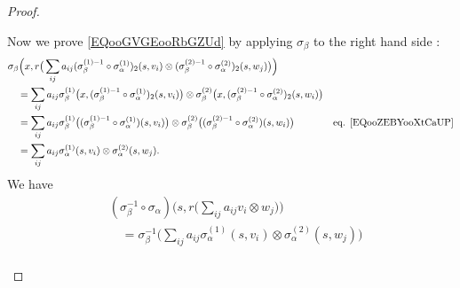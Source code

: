 \begin{proof}
\begin{subproof}
\begin{subproof}
\begin{subproof}
				Now we prove \eqref{EQooGVGEooRbGZUd} by applying \( \sigma_{\beta}\) to the right hand side :
				\begin{subequations}
					\begin{align}
						                                                                                            & \sigma_{\beta}  \Big( x,r\big( \sum_{ij}a_{ij}(\sigma_{\beta}^{(1)-1}\circ \sigma_{\alpha}^{(1)})_2(s,v_i)
						\otimes
						(\sigma_{\beta}^{(2)-1}\circ\sigma_{\alpha}^{(2)})_2(s,w_j)
						\big) \Big)                                                                                                                                                                                              \\
						                                                                                            & \quad  = \sum_{ij}a_{ij}
						\sigma_{\beta}^{(1)}\big( x,  (\sigma_{\beta}^{(1)-1}\circ\sigma_{\alpha}^{(1)})_2(s,v_i) \big)
						\otimes
						\sigma_{\beta}^{(2)}\big( x,  (\sigma_{\beta}^{(2)-1}\circ\sigma_{\alpha}^{(2)})_2(s,w_i) \big)                                                                                                          \\
						                                                                                            & \quad  = \sum_{ij}a_{ij}
						\sigma_{\beta}^{(1)}\big(   (\sigma_{\beta}^{(1)-1}\circ\sigma_{\alpha}^{(1)})(s,v_i) \big)
						\otimes
						\sigma_{\beta}^{(2)}\big(   (\sigma_{\beta}^{(2)-1}\circ\sigma_{\alpha}^{(2)})(s,w_i) \big) & \text{eq. \eqref{EQooZEBYooXtCaUP}}                                                                        \\
						                                                                                            & \quad = \sum_{ij}a_{ij}\sigma_{\alpha}^{(1)}(s,v_i)\otimes \sigma_{\alpha}^{(2)}(s,w_j).
					\end{align}
				\end{subequations}
				\spitem[Conclusion]
				We have
				\begin{subequations}		\label{SUBEQSooRYKSooBkBmaF}
					\begin{align}
						 & (\sigma_{\beta}^{-1}\circ\sigma_{\alpha})\Big( s,r\big( \sum_{ij}a_{ij}v_i\otimes w_j \big) \Big)                                                                                                                               \\
						 & \quad =\sigma_{\beta}^{-1}\Big( \sum_{ij}a_{ij}   \sigma_{\alpha}^{(1)}(s,v_i)\otimes \sigma_{\alpha}^{(2)}(s,w_j)  \Big)                                                                                                       \\

\end{align}
\end{subequations}
\end{subproof}
\end{subproof}
\end{subproof}
\end{proof}
